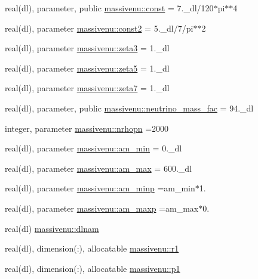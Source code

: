 \begin{DoxyCompactItemize}
\item 
real(dl), parameter, public \mbox{\hyperlink{namespacemassivenu_a70abc43ce18c77a19a2a5a3577cdca33}{massivenu\+::const}} = 7.\+\_\+dl/120$\ast$pi$\ast$$\ast$4
\item 
real(dl), parameter \mbox{\hyperlink{namespacemassivenu_a63b8c9d69523c7f853ffbcc4d48fda0e}{massivenu\+::const2}} = 5.\+\_\+dl/7/pi$\ast$$\ast$2
\item 
real(dl), parameter \mbox{\hyperlink{namespacemassivenu_a51e0c61eba59c96a5b43e2d0c8eacd6f}{massivenu\+::zeta3}} = 1.\+\_\+dl
\item 
real(dl), parameter \mbox{\hyperlink{namespacemassivenu_aee270302c33f3b6976ed226a553b26cf}{massivenu\+::zeta5}} = 1.\+\_\+dl
\item 
real(dl), parameter \mbox{\hyperlink{namespacemassivenu_a7d96619046ccc740edb22a9588426c34}{massivenu\+::zeta7}} = 1.\+\_\+dl
\item 
real(dl), parameter, public \mbox{\hyperlink{namespacemassivenu_a12e889efae466257e45a8341a9f6150e}{massivenu\+::neutrino\+\_\+mass\+\_\+fac}} = 94.\+\_\+dl
\item 
integer, parameter \mbox{\hyperlink{namespacemassivenu_a25f2b3dce3fcea3371981c04a2ebd80c}{massivenu\+::nrhopn}} =2000
\item 
real(dl), parameter \mbox{\hyperlink{namespacemassivenu_a78f8e34c3e80b51195c21fdaa07761b1}{massivenu\+::am\+\_\+min}} = 0.\+\_\+dl
\item 
real(dl), parameter \mbox{\hyperlink{namespacemassivenu_a41419034ccb5dbf62c14483531ca5fb1}{massivenu\+::am\+\_\+max}} = 600.\+\_\+dl
\item 
real(dl), parameter \mbox{\hyperlink{namespacemassivenu_a3d0cea67f62f7fd30ce0c991b6215a9b}{massivenu\+::am\+\_\+minp}} =am\+\_\+min$\ast$1.
\item 
real(dl), parameter \mbox{\hyperlink{namespacemassivenu_a70711a9642331142a38cd93e15ae874a}{massivenu\+::am\+\_\+maxp}} =am\+\_\+max$\ast$0.
\item 
real(dl) \mbox{\hyperlink{namespacemassivenu_a0bc7918cccdf1d31a74fd0b7c68f6249}{massivenu\+::dlnam}}
\item 
real(dl), dimension(\+:), allocatable \mbox{\hyperlink{namespacemassivenu_a17286610cbb3be4f5e2e6cb9207cd3d3}{massivenu\+::r1}}
\item 
real(dl), dimension(\+:), allocatable \mbox{\hyperlink{namespacemassivenu_a1776e9b553839aa3e0328f3104c8def6}{massivenu\+::p1}}
\item 

\end{DoxyCompactItemize}
